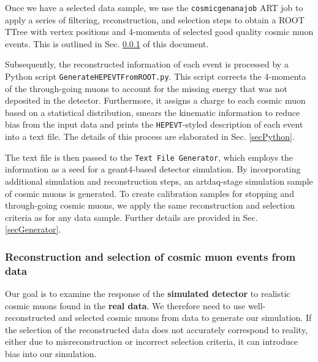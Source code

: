 
Once we have a selected data sample, we use the \texttt{cosmicgenanajob} ART job to apply a series of filtering, reconstruction, and selection steps to obtain a ROOT TTree with vertex positions and 4-momenta of selected good quality cosmic muon events. This is outlined in Sec. \ref{secCosmicGenAna} of this document.

Subsequently, the reconstructed information of each event is processed by a Python script \texttt{GenerateHEPEVTFromROOT.py}. This script corrects the 4-momenta of the through-going muons to account for the missing energy that was not deposited in the detector. Furthermore, it assigns a charge to each cosmic muon based on a statistical distribution, smears the kinematic information to reduce bias from the input data and prints the \texttt{HEPEVT}-styled \cite{HEPEVTFormat} description of each event into a text file. The details of this process are elaborated in Sec. \ref{secPython}.

The text file is then passed to the \texttt{Text File Generator}, which employs the information as a seed for a geant4-based \cite{GEANT4} detector simulation. By incorporating additional simulation and reconstruction steps, an artdaq-stage simulation sample of cosmic muons is generated. To create calibration samples for stopping and through-going cosmic muons, we apply the same reconstruction and selection criteria as for any data sample. Further details are provided in Sec. \ref{secGenerator}. 

\subsubsection{Reconstruction and selection of cosmic muon events from data}\label{secCosmicGenAna}

Our goal is to examine the response of the \textbf{simulated detector} to realistic cosmic muons found in the \textbf{real data}. We therefore need to use well-reconstructed and selected cosmic muons from data to generate our simulation. If the selection of the reconstructed data does not accurately correspond to reality, either due to misreconstruction or incorrect selection criteria, it can introduce bias into our simulation.

